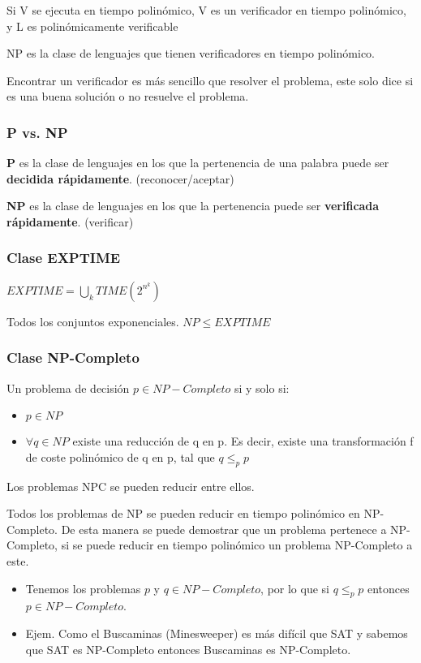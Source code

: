Si V se ejecuta en tiempo polinómico, V es un verificador en tiempo polinómico, y L es polinómicamente verificable

NP es la clase de lenguajes que tienen verificadores en tiempo polinómico.

Encontrar un verificador es más sencillo que resolver el problema, este solo dice si es una buena solución o no resuelve el problema.

\subsubsection{P vs. NP}
\textbf{P} es la clase de lenguajes en los que la pertenencia de una palabra puede ser \textbf{decidida rápidamente}. (reconocer/aceptar)

\textbf{NP} es la clase de lenguajes en los que la pertenencia puede ser \textbf{verificada rápidamente}. (verificar)

\subsubsection{Clase EXPTIME}
$EXPTIME= \bigcup_k TIME(2^{n^k})$

Todos los conjuntos exponenciales. $NP \leq EXPTIME$

\subsubsection{Clase NP-Completo}
Un problema de decisión $p\in NP-Completo$ si y solo si:
\begin{itemize}
  \item $p \in NP$
  \item $\forall q \in NP$ existe una reducción de q en p. Es decir, existe una transformación f de coste polinómico de q en p, tal que $q \leq_p p$
\end{itemize}

Los problemas NPC se pueden reducir entre ellos.

Todos los problemas de NP se pueden reducir en tiempo polinómico en NP-Completo. De esta manera se puede demostrar que un problema pertenece a NP-Completo, si se puede reducir en tiempo polinómico un problema NP-Completo a este.
\begin{itemize}
  \item Tenemos los problemas $p$ y $ q\in NP-Completo$, por lo que si $q \leq_p p$ entonces $p \in NP-Completo$.
  \item Ejem. Como el Buscaminas (Minesweeper) es más difícil que SAT y sabemos que SAT es NP-Completo entonces Buscaminas es NP-Completo.
\end{itemize}

